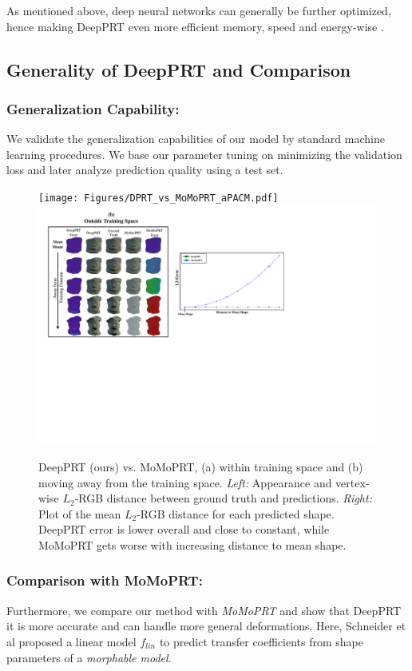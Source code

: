 As mentioned above, deep neural networks can generally be further optimized, hence making DeepPRT even more efficient memory, speed and energy-wise \cite{Survey_NN_Compression}. 
\subsection*{Generality of DeepPRT and Comparison}
\subsubsection*{Generalization Capability:}
We validate the generalization capabilities of our model by standard machine learning procedures. We base our parameter tuning on minimizing the validation loss and later analyze prediction quality using a test set.

\begin{figure}[ht!]
  \centering
    \texttt{[image: Figures/DPRT\_vs\_MoMoPRT\_aPACM.pdf]}
    \includegraphics[width=1.0\textwidth]{Figures/DPRT_vs_MoMoPRT_bPACM.pdf}
     \caption{DeepPRT (ours) vs. MoMoPRT, (a) within training space and (b) moving away from the training space. \textit{ Left:} Appearance and vertex-wise $L_2$-RGB distance between ground truth and predictions.\textit{ Right:} Plot of the mean $L_2$-RGB distance for each predicted shape. DeepPRT error is lower overall and close to constant, while MoMoPRT gets worse with increasing distance to mean shape.}
     \label{Fig:DPRT vs MoMoPRT}
\end{figure}

\subsubsection*{Comparison with MoMoPRT:}
Furthermore, we compare our method with \emph{MoMoPRT} \cite{MoMoPRT} and show that DeepPRT it is more accurate and can handle more general deformations. 
Here, Schneider et al  proposed a linear model $f_{lin}$ to predict transfer coefficients from shape parameters of a \textit{morphable model}.

